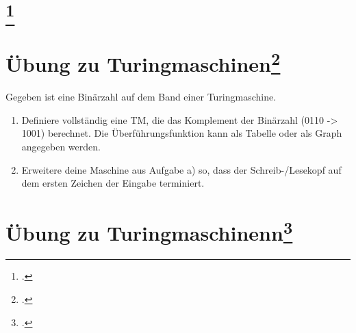 \documentclass{lehramt-informatik-aufgabe}
\begin{document}
\section{
\footcite{theo:fs:3}}


\section{Übung zu Turingmaschinen\footcite[Seite 22]{theo:fs:3}}

Gegeben ist eine Binärzahl auf dem Band einer Turingmaschine.

\begin{enumerate}
\item Definiere vollständig eine TM, die das Komplement der Binärzahl
(0110 -> 1001) berechnet. Die Überführungsfunktion kann als Tabelle oder
als Graph angegeben werden.

\begin{liAntwort}
\end{liAntwort}

\item Erweitere deine Maschine aus Aufgabe a) so, dass der
Schreib-/Lesekopf auf dem ersten Zeichen der Eingabe terminiert.

\begin{liAntwort}
\end{liAntwort}

\end{enumerate}

%

\section{Übung zu Turingmaschinenn\footcite[Seite 27]{theo:fs:3}}

\end{document}
